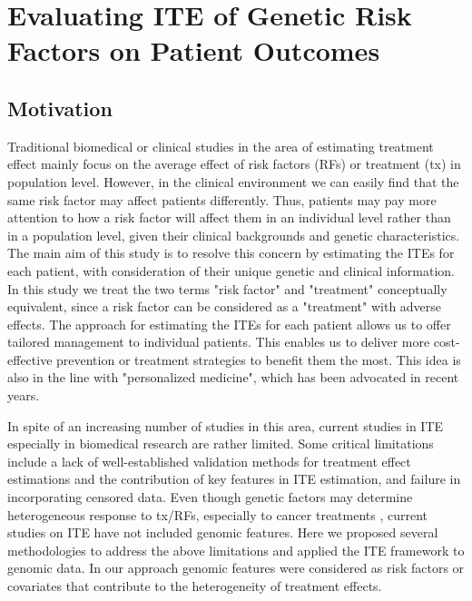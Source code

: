\chapter{Evaluating ITE of Genetic Risk Factors on Patient Outcomes}
\label{chap:ite}

\section{Motivation}
\label{sec:ite_mot}
  Traditional biomedical or clinical studies in the area of estimating treatment effect mainly focus on the average effect of risk factors (RFs) or treatment (tx) in population level. However, in the clinical environment we can easily find that the same risk factor may affect patients differently. Thus, patients may pay more attention to how a risk factor will affect them in an individual level rather than in a population level, given their clinical backgrounds and genetic characteristics. The main aim of this study is to resolve this concern by estimating the ITEs for each patient, with consideration of their unique genetic and clinical information. In this study we treat the two terms "risk factor" and "treatment" conceptually equivalent, since a risk factor can be considered as a "treatment" with adverse effects. The approach for estimating the ITEs for each patient allows us to offer tailored management to individual patients. This enables us to deliver more cost-effective prevention or treatment strategies to benefit them the most. This idea is also in the line with "personalized medicine", which has been advocated in recent years.

  In spite of an increasing number of studies in this area, current studies in ITE especially in biomedical research are rather limited. Some critical limitations include a lack of well-established validation methods for treatment effect estimations and the contribution of key features in ITE estimation, and failure in incorporating censored data. Even though genetic factors may determine heterogeneous response to tx/RFs, especially to cancer treatments \cite{fisher2013cancer}, current studies on ITE have not included genomic features. Here we proposed several methodologies to address the above limitations and applied the ITE framework to genomic data. In our approach genomic features were considered as risk factors or covariates that contribute to the heterogeneity of treatment effects.

